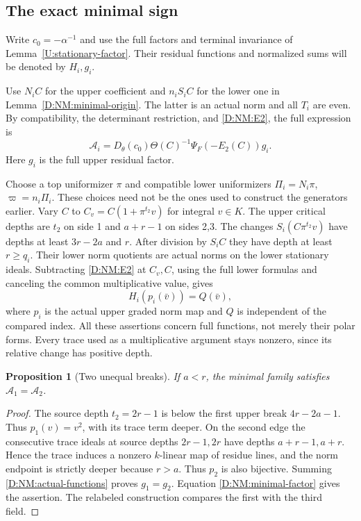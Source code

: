 \documentclass[11pt]{amsart}
\newtheorem{proposition}[theorem]{Proposition}
\theoremstyle{definition}
\theoremstyle{remark}
\begin{document}
\subsection{The exact minimal sign}
Write $c_0=-\alpha^{-1}$ and use the full factors and terminal
invariance of Lemma~\ref{U:stationary-factor}. Their residual functions
and normalized sums will be denoted by $H_i,g_i$.

Use $N_iC$ for the upper coefficient and $n_iS_iC$ for the lower one
in Lemma~\ref{D:NM:minimal-origin}. The latter is an actual norm and all
$T_i$ are even. By compatibility, the determinant restriction, and
\eqref{D:NM:E2}, the full expression is
\begin{equation}\label{D:NM:minimal-factor}
 \mathcal A_i=D_\theta(c_0)\Theta(C)^{-1}
                         \Psi_F(-E_2(C))g_i.
\end{equation}
Here $g_i$ is the full upper residual factor.

Choose a top uniformizer $\pi$ and compatible lower uniformizers
$\Pi_i=N_i\pi$, $\varpi=n_i\Pi_i$. These choices need not be the ones
used to construct the generators earlier. Vary
$C$ to $C_v=C(1+\pi^{t_2}v)$ for integral $v\in K$.
The upper critical depths are $t_2$ on side 1 and $a+r-1$ on sides 2,3.
The changes $S_i(C\pi^{t_2}v)$ have depths at least $3r-2a$ and $r$.
After division by $S_iC$ they have depth at least $r\ge q_i$.
Their lower norm quotients are actual norms on the lower stationary
ideals. Subtracting \eqref{D:NM:E2} at $C_v,C$, using the full lower formulas
and canceling the common multiplicative value, gives
\begin{equation}\label{D:NM:actual-functions}
 H_i(p_i(\bar v))=Q(\bar v),
\end{equation}
where $p_i$ is the actual upper graded norm map and $Q$ is independent
of the compared index. All these assertions concern full functions,
not merely their polar forms. Every trace used as a multiplicative
argument stays nonzero, since its relative change has positive depth.

\begin{proposition}[Two unequal breaks]\label{D:NM:minimal-two}
If $a<r$, the minimal family satisfies $\mathcal A_1=\mathcal A_2$.
\end{proposition}
\begin{proof}
The source depth $t_2=2r-1$ is below the first upper break
$4r-2a-1$. Thus $p_1(v)=v^2$, with its trace term deeper.
On the second edge the consecutive trace ideals at source depths
$2r-1,2r$ have depths $a+r-1,a+r$. Hence the trace induces a nonzero
$k$-linear map of residue lines, and the norm endpoint is strictly deeper
because $r>a$. Thus $p_2$ is also bijective.
Summing \eqref{D:NM:actual-functions} proves $g_1=g_2$.
Equation \eqref{D:NM:minimal-factor} gives the assertion. The relabeled
construction compares the first with the third field.
\end{proof}
\end{document}
